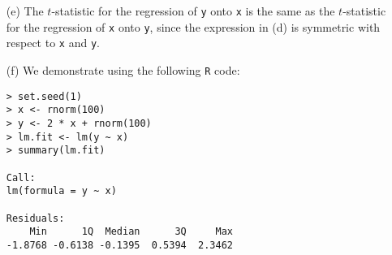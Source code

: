 \begin{itemize}
\begin{proof}
\begin{equation*}
\begin{split}
                        - 2y_ix_i \Biggl[\sum_{i'=1}^n x_{i'}^2\Biggr]
                        \Biggl[\sum_{i'=1}^n x_{i'}y_{i'}\Biggr] \\ 
                    &+ x_i^2 {\Biggl[\sum_{i'=1}^n x_{i'}y_{i'}\Biggr]}^2 \Biggr) / 
                        {\Biggl[\sum_{i'=1}^n x_{i'}^2\Biggr]}^2,
                \end{split}
            \end{equation*}
            so that
            \begin{equation*}
                \begin{split}
                    &\qquad \Biggl(\sum_{i'=1}^n x_{i'}^2\Biggr)
                    \Biggl[\sum_{i=1}^n {(y_i - x_i\hat{\beta})}^2\Biggr] \\
                    = &\Biggl(\sum_{i=1}^n x_i^2\Biggr)
                    \Biggl(\sum_{i'=1}^n y_{i'}^2 \Biggr)
                    - {\Biggl(\sum_{i'=1}^n x_{i'}y_{i'}\Biggr)}^2.
                \end{split}
            \end{equation*}
            Thus, we have
            \begin{equation*}
                \begin{split}
                    \frac{\hat{\beta}}{\text{SE}(\hat{\beta})}
                    &= \frac{(\sqrt{n - 1})\sum_{i=1}^n x_i y_i}
                        {
                            \sqrt{\bigl(\sum_{i=1}^n x_i^2\bigr)
                            \bigl(\sum_{i'=1}^n y_{i'}^2\bigr)
                            - {\bigl(\sum_{i'=1}^n x_{i'}y_{i'}\bigr)}^2}
                        }.
                \end{split}
            \end{equation*}
        \end{proof}
    \item[(e)] The $t$-statistic for the regression of \verb|y| onto \verb|x| is
        the same as the $t$-statistic for the regression of \verb|x| onto \verb|y|,
        since the expression in (d) is symmetric with respect to \verb|x| and 
        \verb|y|.
    \item[(f)] We demonstrate using the following \verb|R| code:
        \scriptsize\begin{verbatim}
> set.seed(1)
> x <- rnorm(100)
> y <- 2 * x + rnorm(100)
> lm.fit <- lm(y ~ x)
> summary(lm.fit)

Call:
lm(formula = y ~ x)

Residuals:
    Min      1Q  Median      3Q     Max 
-1.8768 -0.6138 -0.1395  0.5394  2.3462 


\end{verbatim}
\end{itemize}
